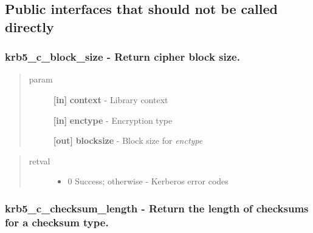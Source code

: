 \documentclass[letterpaper,10pt,english]{sphinxmanual}
\begin{document}
\subsection{Public interfaces that should not be called directly}
\label{appdev/refs/api/index:public-interfaces-that-should-not-be-called-directly}

\subsubsection{krb5\_c\_block\_size -  Return cipher block size.}
\label{appdev/refs/api/krb5_c_block_size:krb5-c-block-size-return-cipher-block-size}\label{appdev/refs/api/krb5_c_block_size::doc}

\begin{fulllineitems}
\label{appdev/refs/api/krb5_c_block_size:c.krb5_c_block_size}
\end{fulllineitems}

\begin{quote}\begin{description}
\item[{param}] \leavevmode
\textbf{{[}in{]}} \textbf{context} - Library context

\textbf{{[}in{]}} \textbf{enctype} - Encryption type

\textbf{{[}out{]}} \textbf{blocksize} - Block size for \emph{enctype}

\end{description}\end{quote}
\begin{quote}\begin{description}
\item[{retval}] \leavevmode\begin{itemize}
\item {} 
0   Success; otherwise - Kerberos error codes

\end{itemize}

\end{description}\end{quote}


\subsubsection{krb5\_c\_checksum\_length -  Return the length of checksums for a checksum type.}
\label{appdev/refs/api/krb5_c_checksum_length:krb5-c-checksum-length-return-the-length-of-checksums-for-a-checksum-type}\label{appdev/refs/api/krb5_c_checksum_length::doc}
\end{document}
